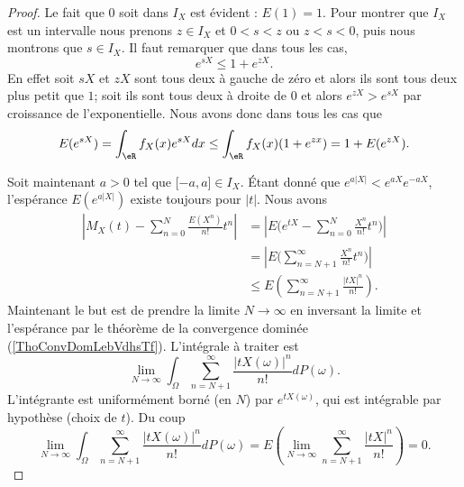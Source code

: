 \begin{proof}
    Le fait que \( 0\) soit dans \( I_X\) est évident : \( E(1)=1\). Pour montrer que \( I_X\) est un intervalle nous prenons \( z\in I_X\) et \( 0<s<z\) ou \( z<s<0\), puis nous montrons que \( s\in I_X\). Il faut remarquer que dans tous les cas,
    \begin{equation}
        e^{sX}\leq 1+ e^{zX}.
    \end{equation}
    En effet soit \( sX\) et \( zX\) sont tous deux à gauche de zéro et alors ils sont tous deux plus petit que \( 1\); soit ils sont tous deux à droite de \( 0\) et alors \( e^{zX}> e^{sX}\) par croissance de l'exponentielle. Nous avons donc dans tous les cas que
    \begin{equation}
        E( e^{sX})=\int_{\eR}f_X(x) e^{sX}dx\leq \int_{\eR}f_X(x)(1+ e^{zx})=1+E( e^{zX}).
    \end{equation}
    
    Soit maintenant \( a>0\) tel que \( \mathopen[ -a , a \mathclose]\in I_X\). Étant donné que \(  e^{a| X |}< e^{aX} e^{-aX}\), l'espérance \( E( e^{a| X |})\) existe toujours pour \( | t |\). Nous avons
    \begin{subequations}
        \begin{align}
            \left| M_X(t)-\sum_{n=0}^N\frac{ E(X^n) }{ n! }t^n \right| &=\left| E\Big(  e^{tX}-\sum_{n=0}^N\frac{ X^n }{ n! }t^n \Big) \right| \\
            &=\left| E\Big( \sum_{n=N+1}^{\infty}\frac{ X^n }{ n! }t^n \Big) \right| \\
            &\leq E\left( \sum_{n=N+1}^{\infty}\frac{ | tX |^n }{ n! } \right).
        \end{align}
    \end{subequations}
    Maintenant le but est de prendre la limite \( N\to\infty\) en inversant la limite et l'espérance par le théorème de la convergence dominée (\ref{ThoConvDomLebVdhsTf}). L'intégrale à traiter est
    \begin{equation}
        \lim_{N\to \infty} \int_{\Omega}\sum_{n=N+1}^{\infty}\frac{ | tX(\omega) |^n }{ n! }dP(\omega).
    \end{equation}
    L'intégrante est uniformément borné (en \( N\)) par \(  e^{tX(\omega)}\), qui est intégrable par hypothèse (choix de \( t\)). Du coup
    \begin{equation}
        \lim_{N\to \infty} \int_{\Omega}\sum_{n=N+1}^{\infty}\frac{ | tX(\omega) |^n }{ n! }dP(\omega)=E\left( \lim_{N\to \infty} \sum_{n=N+1}^{\infty}\frac{ | tX |^n }{ n! } \right)=0.
    \end{equation}
\end{proof}

